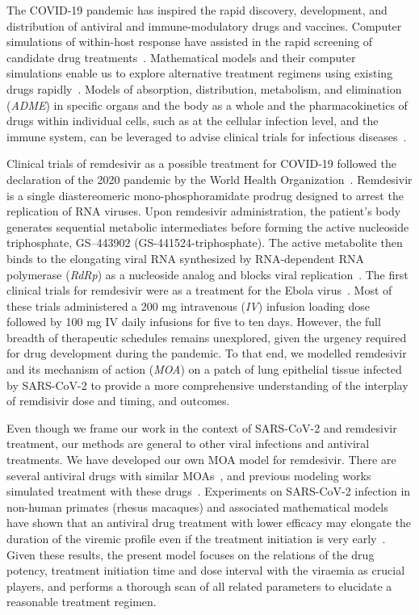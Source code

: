 The COVID-19 pandemic has inspired the rapid discovery, development, and distribution of antiviral and immune-modulatory drugs and vaccines. Computer simulations of within-host response have assisted in the rapid screening of candidate drug treatments~\cite{keshavarzi_arshadi_artificial_2020}. Mathematical models and their computer simulations enable us to explore alternative treatment regimens using existing drugs rapidly~\cite{jenner_leveraging_2020}. Models of absorption, distribution, metabolism, and elimination (\emph{ADME}) in specific organs and the body as a whole and the pharmacokinetics of drugs within individual cells, such as at the cellular infection level, and the immune system, can be leveraged to advise clinical trials for infectious diseases~\cite{ciupe_modeling_2018, best_mathematical_2018, schiffer_herpes_2018}.


Clinical trials of remdesivir as a possible treatment for COVID-19 followed the declaration of the 2020 pandemic by the World Health Organization~\cite{cao_remdesivir_2020, humeniuk_safety_2020, spinner_effect_2020}. Remdesivir is a single diastereomeric mono-phosphoramidate prodrug designed to arrest the replication of RNA viruses. Upon remdesivir administration, the patient's body generates sequential metabolic intermediates before forming the active nucleoside triphosphate, GS--443902 (GS-441524-triphosphate). The active metabolite then binds to the elongating viral RNA synthesized by RNA-dependent RNA polymerase (\emph{RdRp}) as a nucleoside analog and blocks viral replication~\cite{kokic2021mechanism}. The first clinical trials for remdesivir were as a treatment for the Ebola virus~\cite{eastman_remdesivir_2020, spinner_effect_2020}. Most of these trials administered a 200 mg intravenous (\emph{IV}) infusion loading dose followed by 100 mg IV daily infusions for five to ten days. However, the full breadth of therapeutic schedules remains unexplored, given the urgency required for drug development during the pandemic. To that end, we modelled remdesivir and its mechanism of action (\emph{MOA}) on a patch of lung epithelial tissue infected by SARS-CoV-2 to provide a more comprehensive understanding of the interplay of remdisivir dose and timing, and outcomes. 

Even though we frame our work in the context of SARS-CoV-2 and remdesivir treatment, our methods are general to other viral infections and antiviral treatments. We have developed our own MOA model for remdesivir. There are several antiviral drugs with similar MOAs~\cite{mitja2020use,de2016approved}, and previous modeling works simulated treatment with these drugs~\cite{zitzmann2018mathematical,cao2017mechanisms}. Experiments on SARS-CoV-2 infection in non-human primates (rhesus macaques) and associated mathematical models have shown that an antiviral drug treatment with lower efficacy may elongate the duration of the viremic profile even if the treatment initiation is very early~\cite{kim2021incomplete, dobrovolny_quantifying_2020, williamson2020clinical}. Given these results, the present model focuses on the relations of the drug potency, treatment initiation time and dose interval with the viraemia as crucial players, and performs a thorough scan of all related parameters to elucidate a reasonable treatment regimen.

